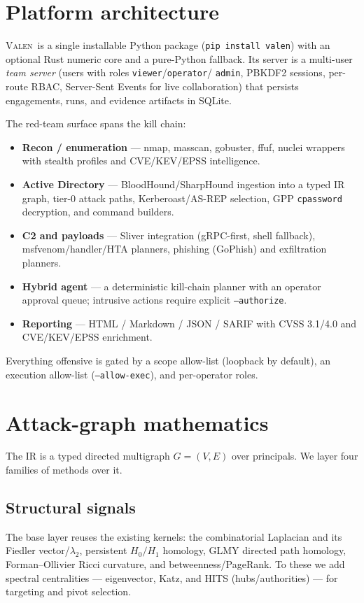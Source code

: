 \documentclass[11pt]{article}
\newcommand{\valen}{\textsc{Valen}}
\begin{document}
\section{Platform architecture}
\valen\ is a single installable Python package (\texttt{pip install valen}) with
an optional Rust numeric core and a pure-Python fallback. Its server is a
multi-user \emph{team server} (users with roles \texttt{viewer}/\texttt{operator}/
\texttt{admin}, PBKDF2 sessions, per-route RBAC, Server-Sent Events for live
collaboration) that persists engagements, runs, and evidence artifacts in SQLite.

The red-team surface spans the kill chain:
\begin{itemize}[itemsep=1pt]
  \item \textbf{Recon / enumeration} --- nmap, masscan, gobuster, ffuf, nuclei
        wrappers with stealth profiles and CVE/KEV/EPSS intelligence.
  \item \textbf{Active Directory} --- BloodHound/SharpHound ingestion into a typed
        IR graph, tier-0 attack paths, Kerberoast/AS-REP selection, GPP
        \texttt{cpassword} decryption, and command builders.
  \item \textbf{C2 and payloads} --- Sliver integration (gRPC-first, shell
        fallback), msfvenom/handler/HTA planners, phishing (GoPhish) and
        exfiltration planners.
  \item \textbf{Hybrid agent} --- a deterministic kill-chain planner with an
        operator approval queue; intrusive actions require explicit
        \texttt{--authorize}.
  \item \textbf{Reporting} --- HTML / Markdown / JSON / SARIF with CVSS 3.1/4.0
        and CVE/KEV/EPSS enrichment.
\end{itemize}
Everything offensive is gated by a scope allow-list (loopback by default), an
execution allow-list (\texttt{--allow-exec}), and per-operator roles.

\section{Attack-graph mathematics}
The IR is a typed directed multigraph $G=(V,E)$ over principals. We layer four
families of methods over it.

\subsection{Structural signals}
The base layer reuses the existing kernels: the combinatorial Laplacian and its
Fiedler vector/$\lambda_2$, persistent $H_0/H_1$ homology, GLMY directed path
homology, Forman--Ollivier Ricci curvature, and betweenness/PageRank. To these we
add spectral centralities --- eigenvector, Katz, and HITS
(hubs/authorities) --- for targeting and pivot selection.
\end{document}
